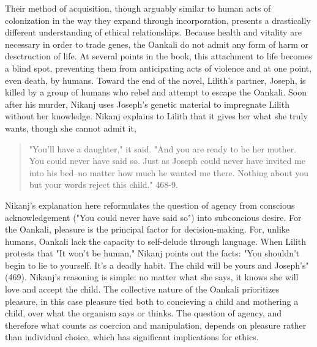 \documentclass[11pt]{article}
\begin{document}
\begin{enumerate}
Their method of acquisition, though arguably similar to human acts of
colonization in the way they expand through incorporation, presents a
drastically different understanding of ethical relationships. Because
health and vitality are necessary in order to trade genes, the Oankali
do not admit any form of harm or desctruction of life. At several
points in the book, this attachment to life becomes a blind spot,
preventing them from anticipating acts of violence and at one point,
even death, by humans. Toward the end of the novel, Lilith's partner,
Joseph, is killed by a group of humans who rebel and attempt to escape
the Oankali. Soon after his murder, Nikanj uses Joseph's genetic
material to impregnate Lilith without her knowledge. Nikanj explains
to Lilith that it gives her what she truly wants, though she cannot
admit it,
\begin{quote}
"You'll have a daughter," it said. "And you are ready to be her
mother. You could never have said so. Just as Joseph could never have
invited me into his bed--no matter how much he wanted me
there. Nothing about you but your words reject this child." 468-9.
\end{quote}
Nikanj's explanation here reformulates the question of agency from
conscious acknowledgement ("You could never have said so") into
subconcious desire. For the Oankali, pleasure is the principal factor
for decision-making. For, unlike humans, Oankali lack the capacity to
self-delude through language. When Lilith protests that "It won't be
human," Nikanj points out the facts: "You shouldn't begin to lie to
yourself. It's a deadly habit. The child will be yours and Joseph's"
(469). Nikanj's reasoning is simple: no matter what she says, it knows
she will love and accept the child. The collective nature of the
Oankali prioritizes pleasure, in this case pleasure tied both to
concieving a child and mothering a child, over what the organism says
or thinks. The question of agency, and therefore what counts as
coercion and manipulation, depends on pleasure rather than individual
choice, which has significant implications for ethics.


\end{enumerate}
\end{document}
